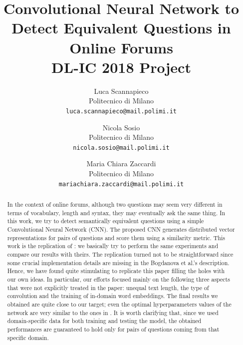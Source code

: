 \documentclass[10pt,twocolumn,letterpaper]{article}
\begin{document}
\title{Convolutional Neural Network to Detect Equivalent Questions in Online Forums  \\ DL-IC 2018 Project} 

\author{Luca Scannapieco\\
Politecnico di Milano\\
{\tt\small luca.scannapieco@mail.polimi.it}
\and
Nicola Sosio\\
Politecnico di Milano\\
{\tt\small nicola.sosio@mail.polimi.it}
\and
Maria Chiara Zaccardi\\
Politecnico di Milano\\
{\tt\small mariachiara.zaccardi@mail.polimi.it}
}

\maketitle

\begin{abstract}
   In the context of online forums, although two questions may seem very different in terms of vocabulary, length and syntax, they may eventually ask the same thing. In this work, we try to detect semantically equivalent questions using a simple Convolutional Neural Network (CNN). The proposed CNN generates distributed vector representations for pairs of questions and score them using a similarity metric. This work is the replication of \cite{bogdanova2015detecting}: we basically try to perform the same experiments and compare our results with theirs. The replication turned not to be straightforward since some crucial implementation details are missing in the Bogdanova et al.'s description. Hence, we have found quite stimulating to replicate this paper filling the holes with our own ideas. In particular, our efforts focused mainly on the following three aspects that were not explicitly treated in the paper: unequal text length, the type of convolution and the training of in-domain word embeddings. The final results we obtained are quite close to our target; even the optimal hyperparameters values of the network are very similar to the ones in \cite{bogdanova2015detecting}. It is worth clarifying that, since we used domain-specific data for both training and testing the model, the obtained performances are guaranteed to hold only for pairs of questions coming from that specific domain.
\end{abstract}
\end{document}
